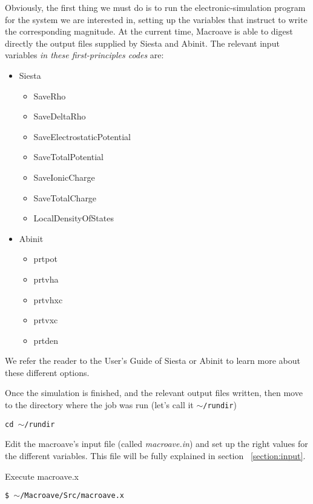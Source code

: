  Obviously, the first thing we must do is to run the 
 electronic-simulation program
 for the system we are interested in, 
 setting up the variables that instruct to write the corresponding
 magnitude. 
 At the current time, {\sc Macroave} is able to digest directly
 the output files supplied by {\sc Siesta} and {\sc Abinit}.
 The relevant input variables {\it in these first-principles codes} are:

 \begin{itemize}
    \item {\sc Siesta}
       \begin{itemize}
          \item SaveRho
          \item SaveDeltaRho
          \item SaveElectrostaticPotential
          \item SaveTotalPotential
          \item SaveIonicCharge
          \item SaveTotalCharge
          \item LocalDensityOfStates
       \end{itemize}
    \item {\sc Abinit}
       \begin{itemize}
          \item prtpot
          \item prtvha
          \item prtvhxc
          \item prtvxc
          \item prtden
       \end{itemize}
 \end{itemize}

 We refer the reader to the User's Guide of {\sc Siesta} or {\sc Abinit}
 to learn more about these different options. 

 Once the simulation is finished, and the relevant output files
 written, then move to the directory where the job was run (let's call it
 {\tt $\sim$/rundir})

 {\tt cd $\sim$/rundir} 
 

 Edit the {\sc macroave}'s input file (called {\it macroave.in})
 and set up the right values for the different variables. This
 file will be fully explained in section ~\ref{section:input}.

 Execute macroave.x

 {\tt \$ $\sim$/Macroave/Src/macroave.x } 

